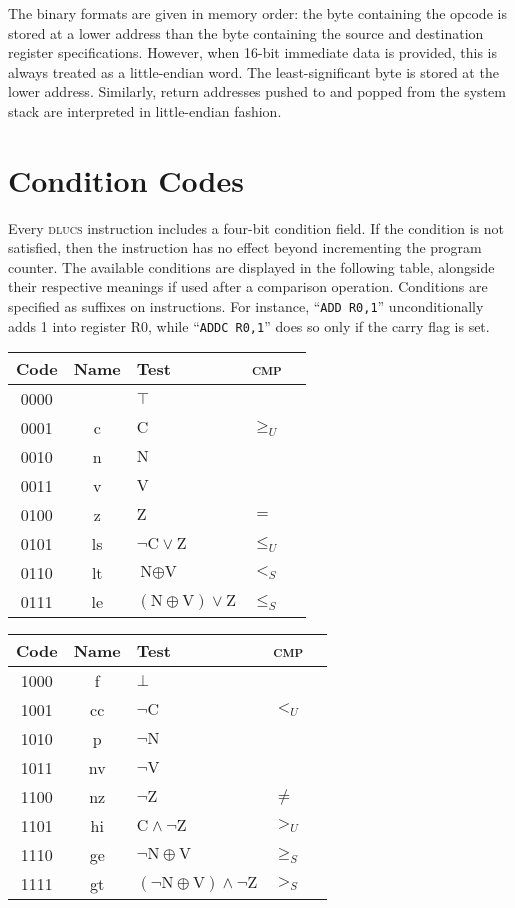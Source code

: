 \documentclass[11pt]{book}
\let\geq\geqslant
\let\leq\leqslant
\begin{document}
The binary formats are given in memory order:
the byte containing the opcode is stored at a lower address
than the byte containing the source
and destination register specifications.
However, when 16-bit immediate data is provided,
this is always treated as a little-endian word.
The least-significant byte is stored at the lower address.
Similarly, return addresses pushed to and popped from the system stack
are interpreted in little-endian fashion.

\section{Condition Codes}
Every \textsc{dlucs} instruction includes a four-bit condition field.
If the condition is not satisfied, then the instruction has no effect
beyond incrementing the program counter.
The available conditions are displayed in the following table,
alongside their respective meanings
if used after a comparison operation.
Conditions are specified as suffixes on instructions.
For instance, ``\texttt{ADD R0,1}''
unconditionally adds 1 into register R0,
while ``\texttt{ADDC R0,1}'' does so
only if the carry flag is set.

\begin{center}
\begin{tabular}{cclll}
  \toprule
  Code&Name&Test&\textsc{cmp}\\\midrule
  0000&&\(\top\)\\
  0001&c&\(\text{C}\)&\(\geq_U\)\\
  0010&n&\(\text{N}\)\\
  0011&v&\(\text{V}\)\\
  0100&z&\(\text{Z}\)&\(=\)\\
  0101&ls&\(\neg\text{C}\vee\text{Z}\)&\(\leq_U\)\\
  0110&lt&\(\text{N}\oplus\text{V}\)&\(<_S\)\\
  0111&le&\((\text{N}\oplus\text{V})\vee\text{Z}\)
  &\(\leq_S\)\\
  \bottomrule
\end{tabular}\qquad
\begin{tabular}{cclll}
  \toprule
  Code&Name&Test&\textsc{cmp}\\\midrule
  1000&f&\(\bot\)\\
  1001&cc&\(\neg\text{C}\)&\(<_U\)\\
  1010&p&\(\neg\text{N}\)\\
  1011&nv&\(\neg\text{V}\)\\
  1100&nz&\(\neg\text{Z}\)&\(\neq\)\\
  1101&hi&\(\text{C}\wedge\neg\text{Z}\)&\(>_U\)\\
  1110&ge&\(\neg\text{N}\oplus\text{V}\)&\(\geq_S\)\\
  1111&gt&\((\neg\text{N}\oplus\text{V})\wedge\neg\text{Z}\)
  &\(>_S\)\\
  \bottomrule
\end{tabular}
\end{center}
\end{document}
